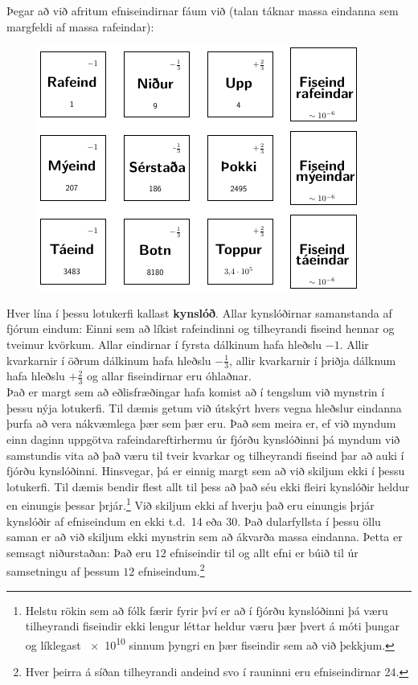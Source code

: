 Þegar að við afritum efniseindirnar fáum við (talan táknar massa eindanna sem margfeldi af massa rafeindar):


\begin{figure}[H]
    \centering
    \includegraphics[width=.5\textwidth]{figures/lotukerfi5.pdf}
\end{figure}

Hver lína í þessu lotukerfi kallast \textbf{kynslóð}. Allar kynslóðirnar samanstanda af fjórum eindum: Einni sem að líkist rafeindinni og tilheyrandi fiseind hennar og tveimur kvörkum. Allar eindirnar í fyrsta dálkinum hafa hleðslu $-1$. Allir kvarkarnir í öðrum dálkinum hafa hleðslu $-\frac{1}{3}$, allir kvarkarnir í þriðja dálknum hafa hleðslu $+\frac{2}{3}$ og allar fiseindirnar eru óhlaðnar. \\

Það er margt sem að eðlisfræðingar hafa komist að í tengslum við mynstrin í þessu nýja lotukerfi. Til dæmis getum við útskýrt hvers vegna hleðslur eindanna þurfa að vera nákvæmlega þær sem þær eru. Það sem meira er, ef við myndum einn daginn uppgötva rafeindareftirhermu úr fjórðu kynslóðinni þá myndum við samstundis vita að það væru til tveir kvarkar og tilheyrandi fiseind þar að auki í fjórðu kynslóðinni. Hinsvegar, þá er einnig margt sem að við skiljum ekki í þessu lotukerfi. Til dæmis bendir flest allt til þess að það séu ekki fleiri kynslóðir heldur en einungis þessar þrjár.\footnote{Helstu rökin sem að fólk færir fyrir því er að í fjórðu kynslóðinni þá væru tilheyrandi fiseindir ekki lengur léttar heldur væru þær þvert á móti þungar og líklegast \SI{e10}{} sinnum þyngri en þær fiseindir sem að við þekkjum.} Við skiljum ekki af hverju það eru einungis þrjár kynslóðir af efniseindum en ekki t.d.~14 eða 30. Það dularfyllsta í þessu öllu saman er að við skiljum ekki mynstrin sem að ákvarða massa eindanna. Þetta er semsagt niðurstaðan: Það eru $12$ efniseindir til og allt efni er búið til úr samsetningu af þessum $12$ efniseindum.\footnote{Hver þeirra á síðan tilheyrandi andeind svo í rauninni eru efniseindirnar 24.} \\

